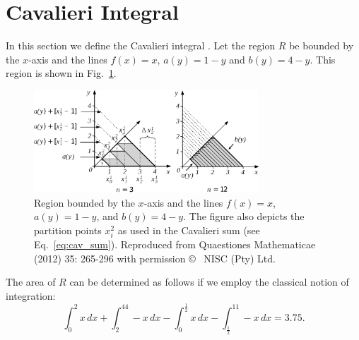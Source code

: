 \documentclass{article}
\theoremstyle{theorem}
\theoremstyle{definition}
\begin{document}
\section{Cavalieri Integral}
In this section we define the Cavalieri integral \cite{ackermann12}. Let the region $R$ be bounded by the $x$-axis and the lines $f(x)=x$, $a(y)=1-y$ and $b(y)=4-y$. This region is shown in Fig.~\ref{fig:caval2}.\\
\begin{figure}[htb]
\centering
\includegraphics[width=0.75\textwidth]{fig13.eps}
\caption{Region bounded by the $x$-axis and the lines $f(x)=x$, $a(y)=1-y$, and $b(y)=4-y$. The figure also depicts the partition points $x_i^2$ as used in the Cavalieri sum (see Eq.~\eqref{eq:cav_sum}). Reproduced from Quaestiones Mathematicae (2012) 35: 265-296 with permission \copyright~ NISC (Pty) Ltd.}
\label{fig:caval2}
\end{figure}

\noindent
The area of $R$ can be determined as follows if we employ the classical notion of integration:
\begin{equation}
\int_0^2x\, dx+\int_2^44-x\, dx- \int_0^{\frac{1}{2}}x\, dx-\int_{\frac{1}{2}}^11-x\, dx = 3.75. 
\end{equation}
\end{document}
